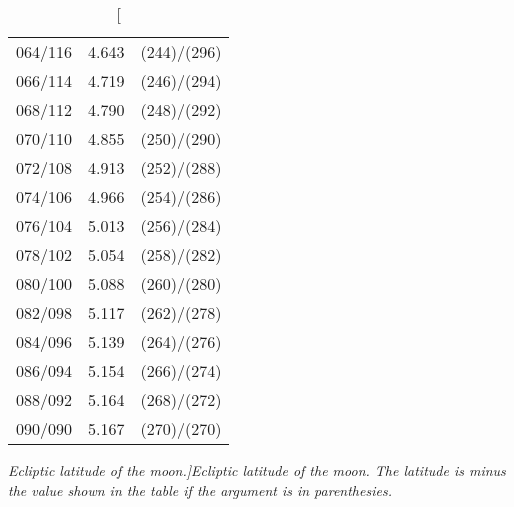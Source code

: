 \begin{table}
{\begin{tabular}{crc}
064/116 &  4.643 & (244)/(296)\\
066/114 &  4.719 & (246)/(294)\\
068/112 &  4.790 & (248)/(292)\\
070/110 &  4.855 & (250)/(290)\\
072/108 &  4.913 & (252)/(288)\\
074/106 &  4.966 & (254)/(286)\\
076/104 &  5.013 & (256)/(284)\\
078/102 &  5.054 & (258)/(282)\\
080/100 &  5.088 & (260)/(280)\\
082/098 &  5.117 & (262)/(278)\\
084/096 &  5.139 & (264)/(276)\\
086/094 &  5.154 & (266)/(274)\\
088/092 &  5.164 & (268)/(272)\\
090/090 &  5.167 & (270)/(270)\\
\end{tabular}}
\caption[\em Ecliptic latitude of the moon.]{\em Ecliptic latitude of the moon.  The latitude is minus the value shown
in the table if the argument is
in parenthesies. }\label{tmoonb}
\end{table}

